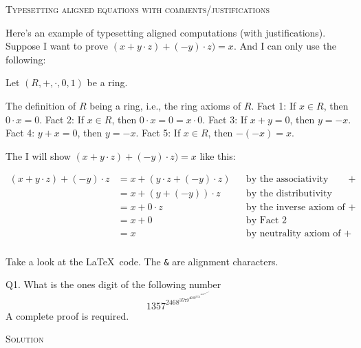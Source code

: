 



\renewcommand\TITLE{Final exam (takehome)}
\newcommand\LISTMARGIN{1in}
\renewcommand{\thethm}{\arabic{thm}}



\topmatter

\newpage
\textsc{Typesetting aligned equations with comments/justifications}

Here's an example of typesetting aligned computations (with justifications).
Suppose I want to prove
$(x + y \cdot z) + (-y) \cdot z) = x$.
And I can only use the following:

Let $(R, +, \cdot, 0, 1)$ be a ring. 
\begin{enumerate}[nosep]
 \li The definition of $R$ being a ring, i.e., the ring axioms of $R$.
 \li Fact 1: If $x \in R$, then $0 \cdot x = 0$.
 \li Fact 2: If $x \in R$, then $0 \cdot x = 0 = x \cdot 0$.
 \li Fact 3: If $x + y = 0$, then $y = -x$.
 \li Fact 4: $y + x = 0$, then $y = -x$.
 \li Fact 5: If $x \in R$, then $-(-x) = x$.
\end{enumerate}

The I will show $(x + y \cdot z) + (-y) \cdot z) = x$
like this:

\begin{align*}
(x + y\cdot z) + (-y) \cdot z &= x + (y \cdot z + (-y) \cdot z) & & \text{by the associativity axiom of $+$} \\
                              &= x + (y + (-y)) \cdot z         & & \text{by the distributivity axiom} \\
                              &= x + 0 \cdot z                  & & \text{by the inverse axiom of $+$} \\
                              &= x + 0                          & & \text{by Fact 2} \\
                              &= x                              & & \text{by neutrality axiom of $+$} \\
\end{align*}

Take a look at the \LaTeX\ code.
The \verb!&! are alignment characters.


\newpage
Q1.
What is the ones digit of the following number
\[
1357^{{2468}^{{3579}^{{4680^{5791^{{6802^{7913^{8024^{9135}}}}}}}}}}
\]
A complete proof is required.

\textsc{Solution}

